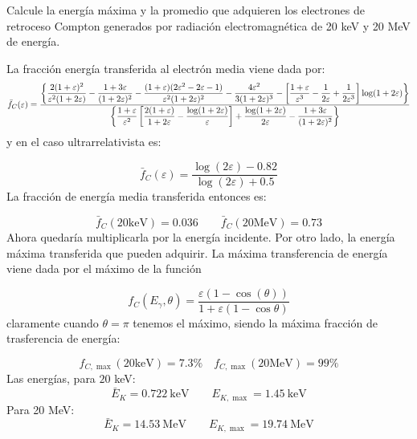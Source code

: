 \begin{Ejercicio}{} 
    Calcule la energía máxima y la promedio que adquieren los electrones de retroceso Compton generados por radiación electromagnética de 20 keV y 20 MeV de energía.
\end{Ejercicio}

La fracción energía transferida al electrón media viene dada por: 
\begin{equation} \scriptsize
\bar{f}_C(\varepsilon) =
\frac{
\left\{
\dfrac{2(1+\varepsilon)^2}{\varepsilon^2(1+2\varepsilon)}
- \dfrac{1+3\varepsilon}{(1+2\varepsilon)^2}
- \dfrac{(1+\varepsilon)(2\varepsilon^2 - 2\varepsilon - 1)}{\varepsilon^2(1+2\varepsilon)^2}
- \dfrac{4\varepsilon^2}{3(1+2\varepsilon)^3}
- \left[\dfrac{1+\varepsilon}{\varepsilon^3} - \dfrac{1}{2\varepsilon} + \dfrac{1}{2\varepsilon^3}\right] \log(1+2\varepsilon)
\right\}
}{
\left\{
\dfrac{1+\varepsilon}{\varepsilon^2} \left[\dfrac{2(1+\varepsilon)}{1+2\varepsilon} - \dfrac{\log(1+2\varepsilon)}{\varepsilon}\right]
+ \dfrac{\log(1+2\varepsilon)}{2\varepsilon}
- \dfrac{1+3\varepsilon}{(1+2\varepsilon)^2}
\right\}
}
\end{equation}
y en el caso ultrarrelativista es: 

\begin{equation} 
\bar{f}_C(\varepsilon) = \frac{\log (2\varepsilon)-0.82}{\log(2\varepsilon)+0.5}
\end{equation}
La fracción de energía media transferida entonces es: 

\begin{equation*}
    \bar{f}_C(20\text{keV}) = 0.036 \qquad 
    \bar{f}_C(20\text{MeV}) = 0.73
\end{equation*}
Ahora quedaría multiplicarla por la energía incidente. Por otro lado, la energía máxima transferida que pueden adquirir. La máxima transferencia de energía viene dada por el máximo de la función

\begin{equation*}
    f_C(E_\gamma,\theta) = \frac{\varepsilon(1-\cos(\theta))}{1+\varepsilon(1-\cos \theta)}
\end{equation*}
claramente cuando $\theta=\pi$ tenemos el máximo, siendo la máxima fracción de trasferencia de energía: 

\begin{equation*}
   f_{C,\max}(20\text{keV}) = 7.3 \%   \quad 
    f_{C,\max}(20\text{MeV}) = 99\%
\end{equation*}
Las energías, para $20$ keV:
\begin{equation*}
    \bar{E}_K = 0.722 \ \text{keV} \qquad  E_{K,\max}= 1.45 \ \text{keV}
\end{equation*}
Para 20 MeV: 
\begin{equation*}
    \bar{E}_K = 14.53 \  \text{MeV} \qquad  E_{K,\max}= 19.74 \ \text{MeV}
\end{equation*}


